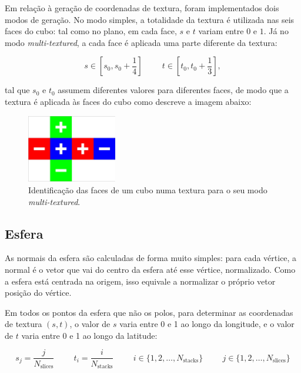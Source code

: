 \documentclass[12pt, a4paper]{article}
\begin{document}
Em relação à geração de coordenadas de textura, foram implementados dois modos de geração. No modo
simples, a totalidade da textura é utilizada nas seis faces do cubo: tal como no plano, em cada
face, $s$ e $t$ variam entre $0$ e $1$. Já no modo \emph{multi-textured}, a cada face é aplicada uma
parte diferente da textura:

$$
s \in \left [ s_0, s_0 + \frac{1}{4} \right ]
\hspace{1cm}
t \in \left [ t_0, t_0 + \frac{1}{3} \right ],
$$

tal que $s_0$ e $t_0$ assumem diferentes valores para diferentes faces, de modo que a textura é
aplicada às faces do cubo como descreve a imagem abaixo:

\begin{figure}[H]
    \centering
    \includegraphics[width=0.35\textwidth]{res/phase4/BoxOrientation.png}
    \caption{Identificação das faces de um cubo numa textura para o seu modo \emph{multi-textured}.}
\end{figure}

\subsection{Esfera}

As normais da esfera são calculadas de forma muito simples: para cada vértice, a normal é o vetor
que vai do centro da esfera até esse vértice, normalizado. Como a esfera está centrada na origem,
isso equivale a normalizar o próprio vetor posição do vértice.

Em todos os pontos da esfera que não os polos, para determinar as coordenadas de textura $(s, t)$, o
valor de $s$ varia entre 0 e 1 ao longo da longitude, e o valor de $t$ varia entre 0 e 1 ao longo da
latitude:

$$
s_j = \frac{j}{N_\text{slices}}
\hspace{1cm}
t_i = \frac{i}{N_\text{stacks}}
\hspace{1cm}
i \in \lbrace 1, 2, \ldots, N_\text{stacks} \rbrace
\hspace{1cm}
j \in \lbrace 1, 2, \ldots, N_\text{slices} \rbrace
$$
\end{document}
